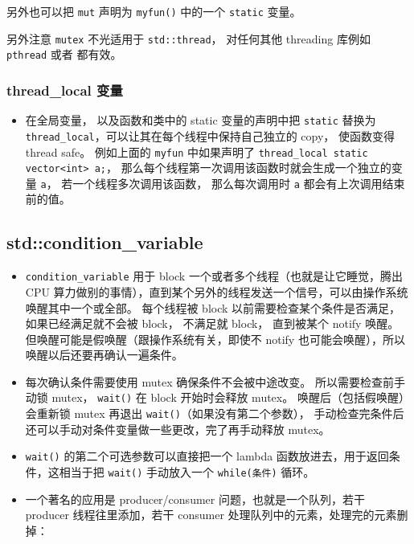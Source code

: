 另外也可以把 \verb`mut` 声明为 \verb`myfun()` 中的一个 \verb`static` 变量。

另外注意 \verb`mutex` 不光适用于 \verb`std::thread`， 对任何其他 threading 库例如 \verb`pthread` 或者  都有效。


\subsubsection{thread\_local 变量}
\begin{itemize}
\item 在全局变量， 以及函数和类中的 static 变量的声明中把 \verb`static` 替换为 \verb`thread_local`，可以让其在每个线程中保持自己独立的 copy， 使函数变得 thread safe。 例如上面的 \verb`myfun` 中如果声明了 \verb`thread_local static vector<int> a;`， 那么每个线程第一次调用该函数时就会生成一个独立的变量 \verb`a`， 若一个线程多次调用该函数， 那么每次调用时 \verb`a` 都会有上次调用结束前的值。
\end{itemize}

\subsection{std::condition\_variable}
\begin{itemize}
\item \verb`condition_variable` 用于 block 一个或者多个线程（也就是让它睡觉，腾出 CPU 算力做别的事情），直到某个另外的线程发送一个信号，可以由操作系统唤醒其中一个或全部。 每个线程被 block 以前需要检查某个条件是否满足，如果已经满足就不会被 block， 不满足就 block， 直到被某个 notify 唤醒。 但唤醒可能是假唤醒（跟操作系统有关，即使不 notify 也可能会唤醒），所以唤醒以后还要再确认一遍条件。
\item 每次确认条件需要使用 mutex 确保条件不会被中途改变。 所以需要检查前手动锁 mutex， \verb`wait()` 在 block 开始时会释放 mutex。 唤醒后（包括假唤醒）会重新锁 mutex 再退出 \verb`wait()`（如果没有第二个参数）， 手动检查完条件后还可以手动对条件变量做一些更改，完了再手动释放 mutex。
\item \verb`wait()` 的第二个可选参数可以直接把一个 lambda 函数放进去，用于返回条件，这相当于把 \verb`wait()` 手动放入一个 \verb`while(条件)` 循环。
\item 一个著名的应用是 producer/consumer 问题，也就是一个队列，若干 producer 线程往里添加，若干 consumer 处理队列中的元素，处理完的元素删掉：
\end{itemize}

